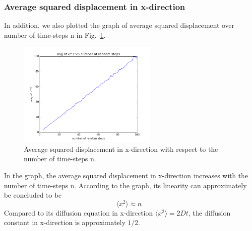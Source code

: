 \documentclass[a4paper,12pt]{article}
\begin{document}
\subsubsection{Average squared displacement in x-direction}
In addition, we also plotted the graph of average squared displacement over number of time-steps n in Fig.~\ref{Fig:x2avg}. \\
\begin{figure}[!htb]
  \centering
  \includegraphics[width=0.6\textwidth]{pics/x2avg.png}
  \caption{Average squared displacement in x-direction with respect to the number of time-steps n.}
  \label{Fig:x2avg}
\end{figure}
In the graph, the average squared displacement in x-direction increases with the number of time-steps n. According to the graph, its linearity can approximately be concluded to be $$\langle x^2 \rangle \approx n$$ Compared to its diffusion equation in x-direction $\langle x^2 \rangle = 2Dt$, the diffusion constant in x-direction is approximately $1/2$.
\end{document}
